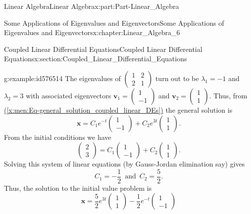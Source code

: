 \documentclass[oneside,10pt,]{book}
\newcommand{\xreffont}{\relax}
\numberwithin{equation}{section}
\newcommand{\bm}[1]{\boldsymbol{#1}}
\newcommand{\amp}{&}
\begin{document}
\begin{partptx}{Linear Algebra}{}{Linear Algebra}{}{}{x:part:Part-Linear_Algebra}
\begin{chapterptx}{Some Applications of Eigenvalues and Eigenvectors}{}{Some Applications of Eigenvalues and Eigenvectors}{}{}{x:chapter:Linear_Algebra_6}
\begin{sectionptx}{Coupled Linear Differential Equations}{}{Coupled Linear Differential Equations}{}{}{x:section:Coupled_Linear_Differential_Equations}
\begin{example}{}{g:example:id576514}
The eigenvalues of \(\begin{pmatrix} 1 \amp 2 \\ 2 \amp 1 \end{pmatrix}\) turn out to be \(\lambda_1 = -1\) and \(\lambda_2 = 3\) with associated eigenvectors \(\bm{v}_1 = \begin{pmatrix} 1 \\ -1 \end{pmatrix}\) and \(\bm{v}_2 = \begin{pmatrix} 1 \\ 1 \end{pmatrix}\). Thus, from \hyperref[x:men:Eq-general_solution_coupled_linear_DEs]{({\xreffont\ref{x:men:Eq-general_solution_coupled_linear_DEs}})} the general solution is%
\begin{equation*}
\bm{x} = C_1 e^{-t} \begin{pmatrix} 1 \\ -1 \end{pmatrix} + C_2 e^{3t} \begin{pmatrix} 1 \\ 1 \end{pmatrix}\text{.}
\end{equation*}
From the initial conditions we have%
\begin{equation*}
\begin{pmatrix} 2 \\ 3 \end{pmatrix} = C_1 \begin{pmatrix} 1 \\ -1 \end{pmatrix} + C_2 \begin{pmatrix} 1 \\ 1 \end{pmatrix}\text{.}
\end{equation*}
Solving this system of linear equations (by Gauss-Jordan elimination say) gives%
\begin{equation*}
C_1 = -\dfrac{1}{2} \, \text{ and } \, C_2 = \dfrac{5}{2}\text{.}
\end{equation*}
Thus, the solution to the initial value problem is%
\begin{equation*}
\bm{x} = \dfrac{5}{2} e^{3t} \begin{pmatrix} 1 \\ 1 \end{pmatrix} - \dfrac{1}{2} e^{-t} \begin{pmatrix} 1 \\ -1 \end{pmatrix}

\end{equation*}
\end{example}
\end{sectionptx}
\end{chapterptx}
\end{partptx}
\end{document}
